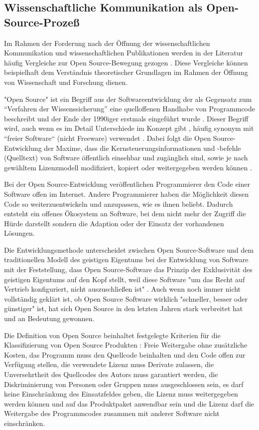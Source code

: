 \subsection{Wissenschaftliche Kommunikation als Open-Source-Prozeß}
Im Rahmen der Forderung nach der Öffnung der wissenschaftlichen Kommunikation und wissenschaftlichen Publikationen werden in der Literatur häufig Vergleiche zur Open Source-Bewegung gezogen \cite{suchen}. Diese Vergleiche können beispielhaft dem Verständnis theoretischer Grundlagen im Rahmen der Öffnung von Wissenschaft und Forschung dienen.

"Open Source" ist ein Begriff aus der Softwareentwicklung der als Gegensatz zum “Verfahren der Wissenssicherung” \cite{stallman2002} eine quelloffenen Handhabe von Programmcode beschreibt und der Ende der 1990iger erstmals eingeführt wurde  \cite{suchen}. Dieser Begriff wird, auch wenn es im Detail Unterschiede im Konzept gibt \cite{suchen}, häufig synonym mit “freier Software“ (nicht Freeware) verwendet \cite{suchen}. Dabei folgt die Open Source-Entwicklung der Maxime, dass die Kernsteuerungsinformationen und -befehle (Quelltext) von Software öffentlich einsehbar und zugänglich sind, sowie je nach gewähltem Lizenzmodell modifiziert, kopiert oder weitergegeben werden können \cite{suchen}.

Bei der Open Source-Entwicklung veröffentlichen Programmierer den Code einer Software offen im Internet. Andere Programmierer haben die Möglichkeit diesen Code so weiterzuentwickeln und anzupassen, wie es ihnen beliebt. Dadurch entsteht ein offenes Ökosystem an Software, bei dem nicht mehr der Zugriff die Hürde darstellt sondern die Adaption oder der Einsatz der vorhandenen Lösungen.

Die Entwicklungsmethode unterscheidet zwischen Open Source-Software und dem traditionellen Modell des geistigen Eigentums bei der Entwicklung von Software mit der Feststellung, dass Open Source-Software das Prinzip der Exklusivität des geistigen Eigentums auf den Kopf stellt, weil diese Software "um das Recht auf Vertrieb konfiguriert, nicht auszuschließen ist" \cite{suchen}. Auch wenn noch immer nicht vollständig geklärt ist, ob Open Source Software wirklich "schneller, besser oder günstiger" ist, hat sich Open Source in den letzten Jahren stark verbreitet hat \cite{Lerner_2001} und an Bedeutung gewonnen.

Die Definition von Open Source beinhaltet festgelegte Kriterien für die Klassifizierung von Open Source Produkten \cite{suchen}: Freie Weitergabe ohne zusätzliche Kosten, das Programm muss den Quellcode beinhalten und den Code offen zur Verfügung stellen, die verwendete Lizenz muss Derivate zulassen, die Unversehrtheit des Quellcodes des Autors muss garantiert werden, die Diskriminierung von Personen oder Gruppen muss ausgeschlossen sein, es darf keine Einschränkung des Einsatzfeldes geben, die Lizenz muss weitergegeben werden können und auf das Produktpaket anwendbar sein und die Lizenz darf die Weitergabe des Programmcodes zusammen mit anderer Software nicht einschränken.

